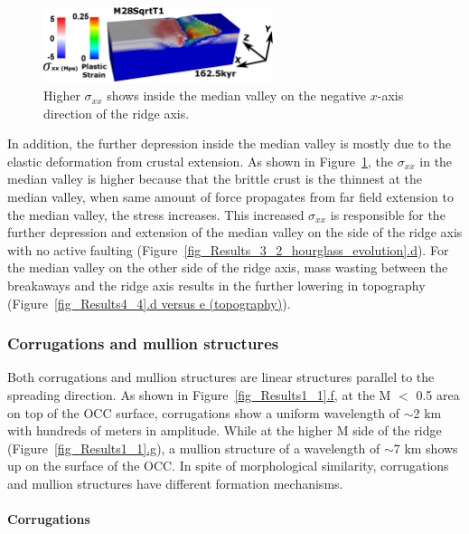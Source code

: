 \begin{figure}[h]
  \centering
    \includegraphics[width=0.6\textwidth]{./Figures/fig_Results4_7_sqrt_cut_back_conjugate_Sxx.eps}
  \caption{Higher $\sigma_{xx}$ shows inside the median valley on the negative $x$-axis direction of the ridge axis. }
 \label{fig_Results4_7}
\end{figure}

In addition, the further depression inside the median valley is mostly due to the elastic deformation from crustal extension. As shown in Figure~\hyperref[fig_Results4_7]{\ref{fig_Results4_7}}, the $\sigma_{xx}$ in the median valley is higher because that the brittle crust is the thinnest at the median valley, when same amount of force propagates from far field extension to the median valley, the stress increases. This increased $\sigma_{xx}$ is responsible for the further depression and extension of the median valley on the side of the ridge axis with no active faulting (Figure~\hyperref[fig_Results_3_2_hourglass_evolution]{\ref{fig_Results_3_2_hourglass_evolution}.d}). For the median valley on the other side of the ridge axis, mass wasting between the breakaways and the ridge axis results in the further lowering in topography (Figure~\hyperref[fig_Results4_4]{\ref{fig_Results4_4}.d versus e (topography)}). 

\subsubsection{Corrugations and mullion structures}

Both corrugations and mullion structures are linear structures parallel to the spreading direction. As shown in Figure~\hyperref[fig_Results1_1]{\ref{fig_Results1_1}.f}, at the M $<$ 0.5 area on top of the OCC surface, corrugations show a uniform wavelength of $\sim$2 km with hundreds of meters in amplitude. While at the higher M side of the ridge (Figure~\hyperref[fig_Results1_1]{\ref{fig_Results1_1}.g}), a mullion structure of a wavelength of $\sim$7 km shows up on the surface of the OCC. In spite of morphological similarity, corrugations and mullion structures have different formation mechanisms. 

\paragraph{Corrugations}


